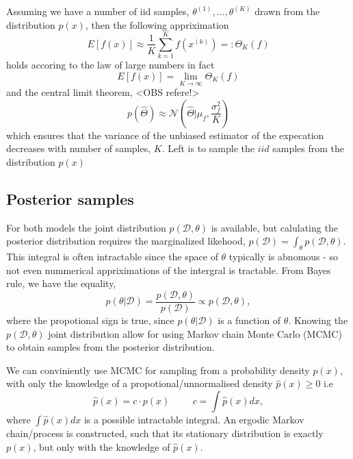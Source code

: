 \begin{testexample2}
    Assuming we have a number of iid samples, $\theta^{(1)}, \dots, \theta^{(K)}$ drawn from the
    distribution $p(x)$, then the following appriximation 
    $$E[f(x)] \approx \frac{1}{K} \sum_{k=1}^K f(x^{(k)}) =: \Theta_{K}(f)$$
    holds accoring to the law of large numbers 
    in fact $$E[f(x)] = \lim_{K \rightarrow \infty} \Theta_{K}(f)$$
    and the central limit theorem, <OBS refere!>
    $$p(\hat \Theta) \approx \mathcal{N}(\hat \Theta |\mu_f, \frac{\sigma_f^2}{K})$$
    which ensures that the variance of the unbiased estimator of the expecation decreases
    with number of samples, $K$. Left is to sample the $iid$ samples from the distribution $p(x)$
\end{testexample2}
\subsection*{Posterior samples}
For both models 
the joint distribution $p(\mathcal{D},\theta)$ is available, but calulating the posterior distribution requires the
marginalized likehood, $p(\mathcal{D}) = \int_{\theta} p(\mathcal{D},\theta)$. This integral is often intractable
since the space of $\theta$ typically is abnomous - so not even nummerical appriximations of the intergral is tractable.
From Bayes rule, we have the equality, 
$$p(\theta|\mathcal{D}) = \frac{p(\mathcal{D},\theta)}{p(\mathcal{D})} \propto
p(\mathcal{D},\theta),$$ where the propotional sign is true, since $p(\theta|\mathcal{D})$ is a
function of $\theta$. Knowing the $p(\mathcal{D},\theta)$ joint distribution allow for using Markov
chain Monte Carlo (MCMC) to obtain samples from the posterior distribution.  

\begin{testexample2}
    We can conviniently use MCMC for sampling from a probability density $p(x)$, with only the knowledge of a 
    propotional/unnormalised density $\hat p(x) \geq 0$ i.e
    $$\hat p(x) = c\cdot p(x) \hspace{1cm} c = \int \hat p(x) dx,$$
    where $\int \hat p(x) dx$ is a possible intractable integral. 
    An ergodic Markov chain/process is constructed, such that its stationary distribution is exactly $p(x)$, but only
    with the knowledge of $\hat p(x)$. 
\end{testexample2}

